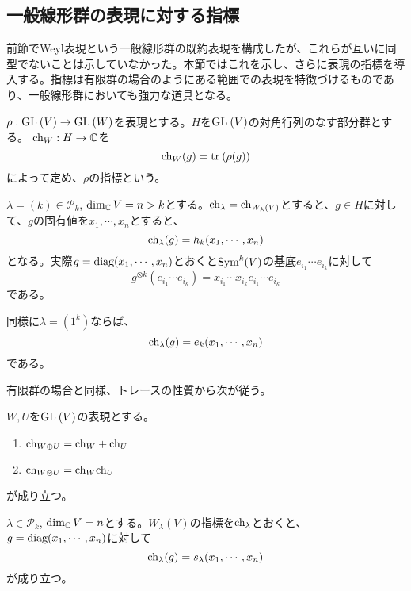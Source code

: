 \documentclass{ltjsreport}
\begin{document}
\subsection{一般線形群の表現に対する指標}

前節でWeyl表現という一般線形群の既約表現を構成したが、これらが互いに同型でないことは示していなかった。本節ではこれを示し、さらに表現の指標を導入する。指標は有限群の場合のようにある範囲での表現を特徴づけるものであり、一般線形群においても強力な道具となる。

\begin{defin}
  $\rho:\text{GL}\:(V)\rightarrow \text{GL}\:(W)$を表現とする。$H$を$\text{GL}\:(V)$の対角行列のなす部分群とする。
  $\text{ch}_W:H\rightarrow \mathbb{C}$を
  \[
  \text{ch}_W(g)=\text{tr}\:(\rho(g))  
  \]
  によって定め、$\rho$の指標という。
\end{defin}

\begin{eg}
  $\lambda=(k)\in\mathcal{P}_k$, $\dim_{\mathbb{C}} V=n>k$とする。$\text{ch}_\lambda=\text{ch}_{W_\lambda(V)}$とすると、$g\in H$に対して、$g$の固有値を$x_1,\cdots,x_n$とすると、
  \[
  \text{ch}_\lambda(g)=h_k(x_1,\cdots,x_n) 
  \]
  となる。実際$g=\text{diag}(x_1,\cdots,x_n)$とおくと$\text{Sym}^k(V)$の基底$e_{i_1}\cdots e_{i_k}$に対して
  \[
  g^{\otimes k}(e_{i_1}\cdots e_{i_k})=x_{i_1}\cdots x_{i_k}e_{i_1}\cdots e_{i_k}  
  \]
  である。
\end{eg}

\begin{eg}
  同様に$\lambda=(1^k)$ならば、
  \[
  \text{ch}_\lambda(g)=e_k(x_1,\cdots,x_n)  
  \]
  である。
\end{eg}

有限群の場合と同様、トレースの性質から次が従う。

\begin{prop}$W,U$を$\text{GL}\:(V)$の表現とする。
  \begin{enumerate}
    \item $\text{ch}_{W\oplus U}=\text{ch}_W+\text{ch}_U$
    \item $\text{ch}_{W\otimes U}=\text{ch}_W\text{ch}_U$
  \end{enumerate}
  が成り立つ。
\end{prop}

\begin{theo}\label{char_schur}
  $\lambda\in\mathcal{P}_k$, $\dim_{\mathbb{C}} V=n$とする。$W_\lambda(V)$の指標を$\text{ch}_\lambda$とおくと、$g=\text{diag}(x_1,\cdots,x_n)$に対して
  \[
  \text{ch}_\lambda(g)=s_\lambda(x_1,\cdots,x_n)
  \]
  が成り立つ。
\end{theo}
\end{document}
